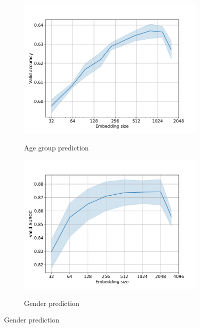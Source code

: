 \documentclass{article}
\begin{document}
\begin{figure}
  \centering
  \caption{Embedding dimensionality vs. quality}
  \begin{subfigure}{0.5\textwidth}
    \caption{Age group prediction}
    \includegraphics[width=\textwidth]{figures/age-pred-hidden-size.pdf}
    \label{fig-emb-dim-age}
  \end{subfigure}%
  \begin{subfigure}{0.5\textwidth}
    \caption{Gender prediction}
    \includegraphics[width=\textwidth]{figures/gender-hidden-size.pdf}
    \label{fig-emb-dim-gender}
  \end{subfigure}
\end{figure}
\end{document}
